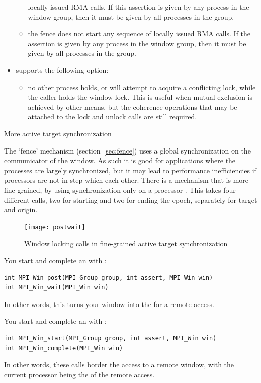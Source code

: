 \begin{itemize}
\begin{itemize}
    locally issued RMA calls. If this assertion is given by any
    process in the window group, then it must be given by all
    processes in the group.
  \item {} the fence does not start any
    sequence of locally issued RMA calls. If the assertion is given by
    any process in the window group, then it must be given by all
    processes in the group.
  \end{itemize}
\item {} supports the following option:
  \begin{itemize}
    \item {} no other process holds, or will attempt to
    acquire a conflicting lock, while the caller holds the window
    lock. This is useful when mutual exclusion is achieved by other
    means, but the coherence operations that may be attached to the
    lock and unlock calls are still required.
  \end{itemize}
\end{itemize}

 {More active target synchronization}
\label{sec:ref:post-wait}

The `fence' mechanism (section~\ref{sec:fence}) uses a global synchronization on the
communicator of the window. As such it is good for applications where
the processes are largely synchronized, but it may 
lead to performance inefficiencies if processors are not in step which each other. 
There is a mechanism that is more fine-grained, by using synchronization only 
on a processor . This takes four different calls, two for starting
and two for ending the epoch, separately for target and origin.
\begin{figure}[ht]
  \texttt{[image: postwait]}
  \caption{Window locking calls in fine-grained active target synchronization}
  \label{fig:postwait}
\end{figure}

You start and complete an  with%
:
\begin{lstlisting}
int MPI_Win_post(MPI_Group group, int assert, MPI_Win win)
int MPI_Win_wait(MPI_Win win)
\end{lstlisting}
In other words, this turns your window into the  for a remote access.

You start and complete an  with%
:
\begin{lstlisting}
int MPI_Win_start(MPI_Group group, int assert, MPI_Win win)
int MPI_Win_complete(MPI_Win win)
\end{lstlisting}
In other words, these calls border the access to a remote window, with the current processor
being the  of the remote access.

